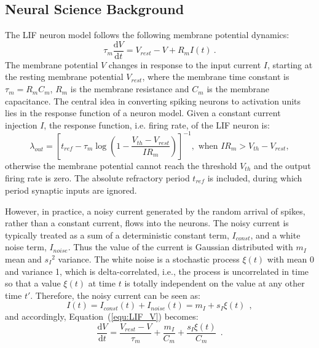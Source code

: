 \documentclass[runningheads,a4paper]{llncs}
\def\D{\mathrm{d}}
\begin{document}
\subsection{Neural Science Background}
The LIF neuron model follows the following membrane potential dynamics:
\begin{equation}
\tau_m \frac{\D V}{\D t}=V_{rest} - V + R_{m} I(t) ~.
\label{equ:LIF_V}
\end{equation}
The membrane potential $V$ changes in response to the input current $I$, starting at the resting membrane potential $V_{rest}$, where the membrane time constant is $\tau_m = R_mC_m$, $R_m$ is the membrane resistance and $C_m$ is the membrane capacitance.
The central idea in converting spiking neurons to activation units lies in the response function of a neuron model.
Given a constant current injection $I$, the response function, i.e. firing rate, of the LIF neuron is:
\begin{equation}
\lambda_\mathit{out}=
\left [ t_\mathit{ref}-\tau_m\log \left ( 1-\frac{V_{th}-V_\mathit{rest}}{IR_m}  \right )\right ]^{-1}, \textrm{~when~} IR_m>V_{th}-V_{rest},
\label{equ:consI}
\end{equation}
otherwise the membrane potential cannot reach the threshold $V_{th}$ and the output firing rate is zero. 
The absolute refractory period $t_\mathit{ref}$ is included, during which period synaptic inputs are ignored.

However, in practice, a noisy current generated by the random arrival of spikes, rather than a constant current, flows into the neurons.
The noisy current is typically treated as a sum of a deterministic constant term, $I_{const}$, and a white noise term, $I_{noise}$.
Thus the value of the current is Gaussian distributed with $m_I$ mean and ${s_I}^2$ variance.
The white noise is a stochastic process $\xi(t)$ with mean 0 and variance 1, which is delta-correlated, i.e., the process is uncorrelated in time so that a value $\xi(t)$ at time $t$ is totally independent on the value at any other time $t'$.
Therefore, the noisy current can be seen as:
\begin{equation}
I(t) = I_{const}(t)+I_{noise}(t) = m_I + s_I\xi(t)~~,
\label{equ:noisyI}
\end{equation}
and accordingly, Equation~(\ref{equ:LIF_V}) becomes:
\begin{equation}
\frac{\D V}{\D t}=\frac{V_{rest} - V}{\tau_m } + \frac{m_I}{C_m} + \frac{s_I\xi(t)}{C_m}~~.
\label{equ:LIF_V2}
\end{equation}
\end{document}

